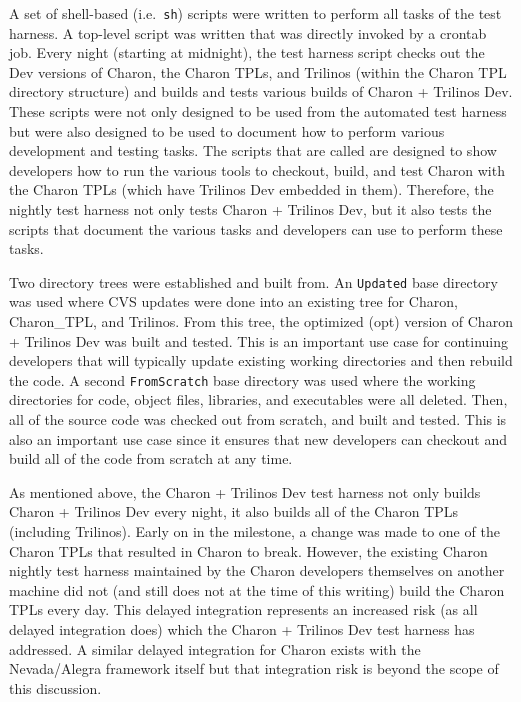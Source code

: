 \documentclass[pdf,ps2pdf,11pt]{SANDreport}
\begin{document}
A set of shell-based (i.e.\ {}\texttt{sh}) scripts were written to perform all
tasks of the test harness.  A top-level script was written that was directly
invoked by a crontab job.  Every night (starting at midnight), the test
harness script checks out the Dev versions of Charon, the Charon TPLs, and
Trilinos (within the Charon TPL directory structure) and builds and tests
various builds of Charon + Trilinos Dev.  These scripts were not only designed
to be used from the automated test harness but were also designed to be used
to document how to perform various development and testing tasks.  The scripts
that are called are designed to show developers how to run the various tools
to checkout, build, and test Charon with the Charon TPLs (which have Trilinos
Dev embedded in them).  Therefore, the nightly test harness not only tests
Charon + Trilinos Dev, but it also tests the scripts that document the various
tasks and developers can use to perform these tasks.

Two directory trees were established and built from.  An {}\texttt{Updated}
base directory was used where CVS updates were done into an existing tree for
Charon, Charon\_TPL, and Trilinos.  From this tree, the optimized (opt)
version of Charon + Trilinos Dev was built and tested.  This is an important
use case for continuing developers that will typically update existing working
directories and then rebuild the code.  A second {}\texttt{FromScratch} base
directory was used where the working directories for code, object files,
libraries, and executables were all deleted.  Then, all of the source code was
checked out from scratch, and built and tested.  This is also an important use
case since it ensures that new developers can checkout and build all of the
code from scratch at any time.

As mentioned above, the Charon + Trilinos Dev test harness not only builds
Charon + Trilinos Dev every night, it also builds all of the Charon TPLs
(including Trilinos).  Early on in the milestone, a change was made to one of
the Charon TPLs that resulted in Charon to break.  However, the existing
Charon nightly test harness maintained by the Charon developers themselves on
another machine did not (and still does not at the time of this writing) build
the Charon TPLs every day.  This delayed integration represents an increased
risk (as all delayed integration does) which the Charon + Trilinos Dev test
harness has addressed.  A similar delayed integration for Charon exists with
the Nevada/Alegra framework itself but that integration risk is beyond the
scope of this discussion.
\end{document}
